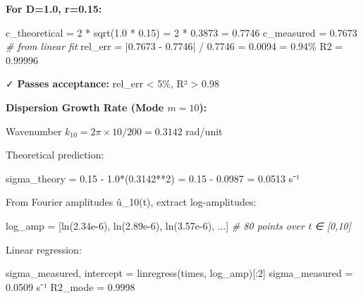 \documentclass[
]{article}
\newenvironment{Shaded}{}{}
\newcommand{\CommentTok}[1]{\textcolor[rgb]{0.38,0.63,0.69}{\textit{#1}}}
\newcommand{\DecValTok}[1]{\textcolor[rgb]{0.25,0.63,0.44}{#1}}
\newcommand{\FloatTok}[1]{\textcolor[rgb]{0.25,0.63,0.44}{#1}}
\newcommand{\NormalTok}[1]{#1}
\newcommand{\OperatorTok}[1]{\textcolor[rgb]{0.40,0.40,0.40}{#1}}
\begin{document}
\textbf{For D=1.0, r=0.15:}

\begin{Shaded}
\begin{Highlighting}[]
\NormalTok{c\_theoretical }\OperatorTok{=} \DecValTok{2} \OperatorTok{*}\NormalTok{ sqrt(}\FloatTok{1.0} \OperatorTok{*} \FloatTok{0.15}\NormalTok{) }\OperatorTok{=} \DecValTok{2} \OperatorTok{*} \FloatTok{0.3873} \OperatorTok{=} \FloatTok{0.7746}
\NormalTok{c\_measured }\OperatorTok{=} \FloatTok{0.7673}  \CommentTok{\# from linear fit}
\NormalTok{rel\_err }\OperatorTok{=} \OperatorTok{|}\FloatTok{0.7673} \OperatorTok{{-}} \FloatTok{0.7746}\OperatorTok{|} \OperatorTok{/} \FloatTok{0.7746} \OperatorTok{=} \FloatTok{0.0094} \OperatorTok{=} \FloatTok{0.94}\OperatorTok{\%}
\NormalTok{R2 }\OperatorTok{=} \FloatTok{0.99996}
\end{Highlighting}
\end{Shaded}

✓ \textbf{Passes acceptance:} rel\_err \textless{} 5\%, R²
\textgreater{} 0.98

\textbf{Dispersion Growth Rate (Mode \(m=10\)):}

Wavenumber \(k_{10} = 2\pi\times 10/200 = 0.3142\) rad/unit

Theoretical prediction:

\begin{Shaded}
\begin{Highlighting}[]
\NormalTok{sigma\_theory }\OperatorTok{=} \FloatTok{0.15} \OperatorTok{{-}} \FloatTok{1.0}\OperatorTok{*}\NormalTok{(}\FloatTok{0.3142}\OperatorTok{**}\DecValTok{2}\NormalTok{) }\OperatorTok{=} \FloatTok{0.15} \OperatorTok{{-}} \FloatTok{0.0987} \OperatorTok{=} \FloatTok{0.0513}\NormalTok{ s⁻¹}
\end{Highlighting}
\end{Shaded}

From Fourier amplitudes \textbar û\_10(t)\textbar, extract
log-amplitudes:

\begin{Shaded}
\begin{Highlighting}[]
\NormalTok{log\_amp }\OperatorTok{=}\NormalTok{ [ln(}\FloatTok{2.34e{-}6}\NormalTok{), ln(}\FloatTok{2.89e{-}6}\NormalTok{), ln(}\FloatTok{3.57e{-}6}\NormalTok{), ...]  }\CommentTok{\# 80 points over t ∈ [0,10]}
\end{Highlighting}
\end{Shaded}

Linear regression:

\begin{Shaded}
\begin{Highlighting}[]
\NormalTok{sigma\_measured, intercept }\OperatorTok{=}\NormalTok{ linregress(times, log\_amp)[:}\DecValTok{2}\NormalTok{]}
\NormalTok{sigma\_measured }\OperatorTok{=} \FloatTok{0.0509}\NormalTok{ s⁻¹}
\NormalTok{R2\_mode }\OperatorTok{=} \FloatTok{0.9998}
\end{Highlighting}
\end{Shaded}
\end{document}
